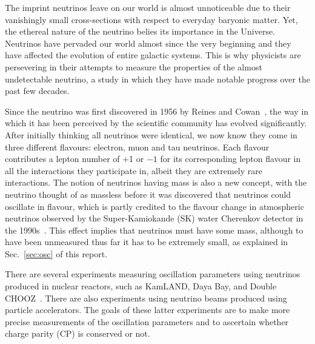\documentclass[aps,pra,12pt,notitlepage,tightenlines]{revtex4-1}
\begin{document}
The imprint neutrinos leave on our world is almost unnoticeable due to their vanishingly small cross-sections with respect to everyday baryonic matter. Yet, the ethereal nature of the neutrino belies its importance in the Universe. Neutrinos have pervaded our world almost since the very beginning and they have affected the evolution of entire galactic systems. This is why physicists are persevering in their attempts to measure the properties of the almost undetectable neutrino, a study in which they have made notable progress over the past few decades. 

Since the neutrino was first discovered in 1956 by Reines and Cowan~\cite{1956Natur.178..446R}, the way in which it has been perceived by the scientific community has evolved significantly. After initially thinking all neutrinos were identical, we now know they come in three different flavours: electron, muon and tau neutrinos. Each flavour contributes a lepton number of +1 or $-1$ for its corresponding lepton flavour in all the interactions they participate in, albeit they are extremely rare interactions. The notion of neutrinos having mass is also a new concept, with the neutrino thought of as massless before it was discovered that neutrinos could oscillate in flavour, which is partly credited to the flavour change in atmospheric neutrinos observed by the Super-Kamiokande (SK) water Cherenkov detector in the 1990s~\cite{Fukuda1998}. This effect implies that neutrinos must have some mass, although to have been unmeasured thus far it has to be extremely small, as explained in Sec.\ \ref{sec:osc} of this report.


There are several experiments measuring oscillation parameters using neutrinos produced in nuclear reactors, such as KamLAND, Daya Bay, and Double CHOOZ~\cite{Suzuki2014, PhysRevLett.108.171803, PhysRevLett.108.131801}. There are also experiments using neutrino beams produced using particle accelerators. The goals of these latter experiments are to make more precise measurements of the oscillation parameters and to ascertain whether charge parity (CP) is conserved or not.
\end{document}
